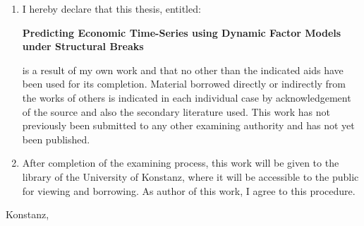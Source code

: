 \documentclass[12pt]{article}
\begin{document}
\raggedright
\begin{enumerate}
\item{I hereby declare that this thesis, entitled: \\
\vspace{0.5cm}
\begin{center}
	\textbf{Predicting Economic Time-Series using Dynamic Factor Models under Structural Breaks}
\end{center}


is a result of my own work and that no other than the indicated aids have been used for
its completion. Material borrowed directly or indirectly from the works of others is
indicated in each individual case by acknowledgement of the source and also the
secondary literature used.
This work has not previously been submitted to any other examining authority and has
not yet been published.
}

\item{After completion of the examining process, this work will be given to the library of the
University of Konstanz, where it will be accessible to the public for viewing and borrowing. As author of this work, I agree to this procedure.}
\end{enumerate}

\vspace{1cm}
Konstanz, \underline{\hspace{4cm}} \hspace{3cm} \underline{\hspace{6cm}}
\\
\vspace{1cm}
\end{document}
